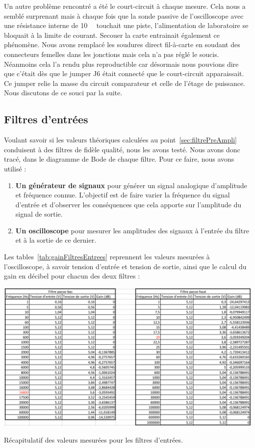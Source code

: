 \documentclass[10pt, oneside, a4paper]{article}
\begin{document}
Un autre problème rencontré a été le court-circuit à chaque mesure.
Cela nous a semblé surprenant mais à chaque fois que la sonde passive de l'oscilloscope avec une résistance interne de \SI{10}{\mega\Omega} touchait une piste, l'alimentation de laboratoire se bloquait à la limite de courant.
Secouer la carte entrainait également ce phénomène.
Nous avons remplacé les soudures direct fil-à-carte en soudant des connecteurs femelles dans les jonctions mais cela n'a pas réglé le soucis.
Néanmoins cela l'a rendu plus reproductible car désormais nous pouvions dire que c'était dès que le jumper J6 était connecté que le court-circuit apparaissait.
Ce jumper relie la masse du circuit comparateur et celle de l'étage de puissance.
Nous discutons de ce souci par la suite.

\subsection{Filtres d'entrées}
Voulant savoir si les valeurs théoriques calculées au point~\ref{sec:filtrePreAmpli}
conduisent à des filtres de fidèle qualité, nous les avons testé.
Nous avons donc tracé, dans le diagramme de Bode de chaque filtre.
Pour ce faire, nous avons utilisé :
\begin{enumerate}
    \item\textbf{Un générateur de signaux} pour générer un signal analogique
        d'amplitude et fréquence connue.
        L'objectif est de faire varier la fréquence du signal d'entrée et d'observer les
        conséquences que cela apporte sur l'amplitude du signal de sortie.
    \item\textbf{Un oscilloscope} pour mesurer les amplitudes des signaux à l'entrée du
        filtre et à la sortie de ce dernier.
\end{enumerate}

Les tables~\ref{tab:gainFiltresEntrees} reprennent les valeurs mesurées à l'oscilloscope, à savoir tension d'entrée et tension de sortie, ainsi que le calcul du gain en décibel pour chacun des deux filtres :
\begin{table}[!ht]
    \centering
    \includegraphics[scale=0.57]{image/resultat-filtres.jpg}
    \caption{Récapitulatif des valeurs mesurées pour les filtres d'entrées.}
    \label{tab:gainFiltresEntrees}
\end{table}
\end{document}
